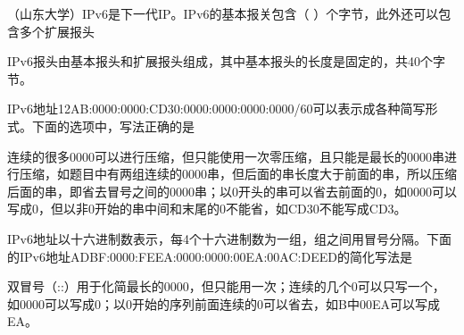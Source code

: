 \question （山东大学）IPv6是下一代IP。IPv6的基本报关包含（
）个字节，此外还可以包含多个扩展报头
\par{}
\begin{solution}IPv6报头由基本报头和扩展报头组成，其中基本报头的长度是固定的，共40个字节。
\end{solution}
\question IPv6地址12AB:0000:0000:CD30:0000:0000:0000:0000/60可以表示成各种简写形式。下面的选项中，写法正确的是
\par{}
\begin{solution}连续的很多0000可以进行压缩，但只能使用一次零压缩，且只能是最长的0000串进行压缩，如题目中有两组连续的0000串，但后面的串长度大于前面的串，所以压缩后面的串，即省去冒号之间的0000串；以0开头的串可以省去前面的0，如0000可以写成0，但以非0开始的串中间和末尾的0不能省，如CD30不能写成CD3。
\end{solution}
\question IPv6地址以十六进制数表示，每4个十六进制数为一组，组之间用冒号分隔。下面的IPv6地址ADBF:0000:FEEA:0000:0000:00EA:00AC:DEED的简化写法是
\par{}
\begin{solution}双冒号（::）用于化简最长的0000，但只能用一次；连续的几个0可以只写一个，如0000可以写成0；以0开始的序列前面连续的0可以省去，如B中00EA可以写成EA。
\end{solution}
